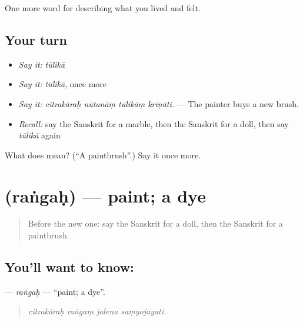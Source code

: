\begin{grammarlens}[title={What you've built}]
One more word for describing what you lived and felt.
\end{grammarlens}

\subsection*{Your turn}
\begin{itemize}
\raggedright
  \item \emph{Say it:} \emph{tūlikā}
  \item \emph{Say it:} \emph{tūlikā}, once more
  \item \emph{Say it:} \emph{citrakāraḥ nūtanāṃ tūlikāṃ krīṇāti.} — The painter buys a new brush.
  \item \emph{Recall:} say the Sanskrit for a marble, then the Sanskrit for a doll, then say \emph{tūlikā} again
\end{itemize}

\begin{tcolorbox}[breakable,colback=teal!4,colframe=teal!35!black,title={Before you move on}]
What does  mean? (\textquotedblleft{}A paintbrush\textquotedblright{}.) Say it once more.
\end{tcolorbox}
\section[\texorpdfstring{\sk{रंगः} (raṅgaḥ)}{रंगः (raṅgaḥ)}]{ (raṅgaḥ) — paint; a dye}

\label{lesson:SA-C518-rangah}



\begin{quote}
Before the new one: say the Sanskrit for a doll, then the Sanskrit for a paintbrush.
\end{quote}

\subsection*{You'll want to know: }
\textbf{} — \emph{raṅgaḥ} — \textquotedblleft{}paint; a dye\textquotedblright{}.

\begin{quote}
   
\end{quote}

\begin{quote}
\emph{citrakāraḥ raṅgaṃ jalena saṃyojayati.}
\end{quote}

